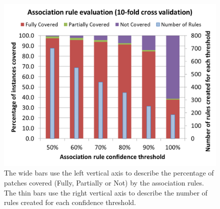 \documentclass[conference]{IEEEtran}
\begin{document}

\begin{figure}[!h]
  \centering
    \includegraphics[width=\columnwidth]{10FoldXVal4}
  \caption{The wide bars use the left vertical axis to describe the percentage of patches covered (Fully, Partially or Not) by the association rules. The thin bars use the right vertical axis to describe the number of rules created for each confidence threshold.}
  \label{fig:assocRulesEvaluation}
\end{figure}
\end{document}
